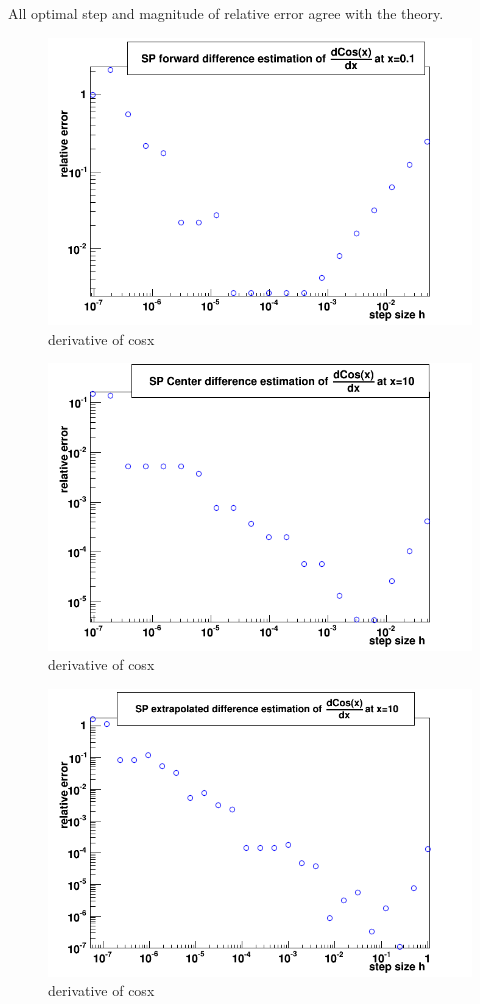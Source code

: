 \documentclass[%
aip,
 jmp,%
 amsmath,amssymb,
preprint,%
]{revtex4-1}
\begin{document}
All optimal step and magnitude of relative error agree with the theory.

\begin{figure}
\includegraphics[scale=0.6]{cos_forward_10} 
\caption{ derivative of cosx}
\label{sat}
\end{figure}

\begin{figure}
\includegraphics[scale=0.6]{cos_center_10} 
\caption{ derivative of cosx}
\label{sat}
\end{figure}

\begin{figure}
\includegraphics[scale=0.6]{cos_extra_10} 
\caption{ derivative of cosx}
\label{sat}
\end{figure}
\end{document}
